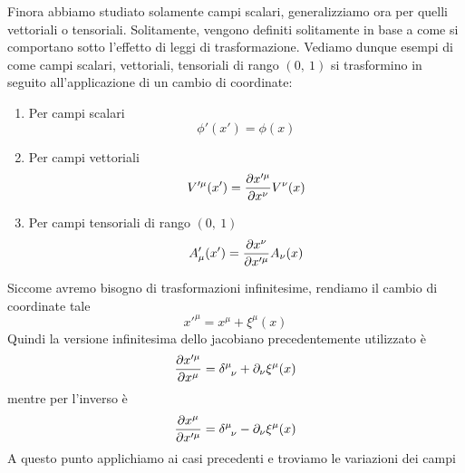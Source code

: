     Finora abbiamo studiato solamente campi scalari, generalizziamo ora per quelli vettoriali o tensoriali. Solitamente, vengono definiti solitamente in base a come si comportano sotto l'effetto di leggi di trasformazione. Vediamo dunque esempi di come campi scalari, vettoriali, tensoriali di rango $(0,~1)$ si trasformino in seguito all'applicazione di un cambio di coordinate:
    \begin{enumerate}
        \item Per campi scalari
    \begin{equation*}
        \phi'(x') = \phi(x)
    \end{equation*}
        \item Per campi vettoriali
    \begin{equation*}
        V'^\mu(x') = \frac{\partial x'^\mu}{\partial x^\nu} V^\nu(x)
    \end{equation*}
        \item Per campi tensoriali di rango $(0,~1)$
    \begin{equation*}
        A'_\mu(x') = \frac{\partial x^\nu}{\partial x'^\mu} A_\nu(x)
    \end{equation*}
    \end{enumerate} 
        Siccome avremo bisogno di trasformazioni infinitesime, rendiamo il cambio di coordinate tale 
    \begin{equation*}
        x'^\mu = x^\mu + \xi^\mu(x)
    \end{equation*}
        Quindi la versione infinitesima dello jacobiano precedentemente utilizzato è 
    \begin{equation*}
        \pdv{x'^\mu}{x^\mu} = \delta^{\mu}_{\phantom \mu \nu} + \partial_\nu \xi^\mu(x)
    \end{equation*}
        mentre per l'inverso è 
    \begin{equation*}
        \pdv{x^\mu}{x'^\mu} = \delta^{\mu}_{\phantom \mu \nu} - \partial_\nu \xi^\mu(x)
    \end{equation*}
        A questo punto applichiamo ai casi precedenti e troviamo le variazioni dei campi
